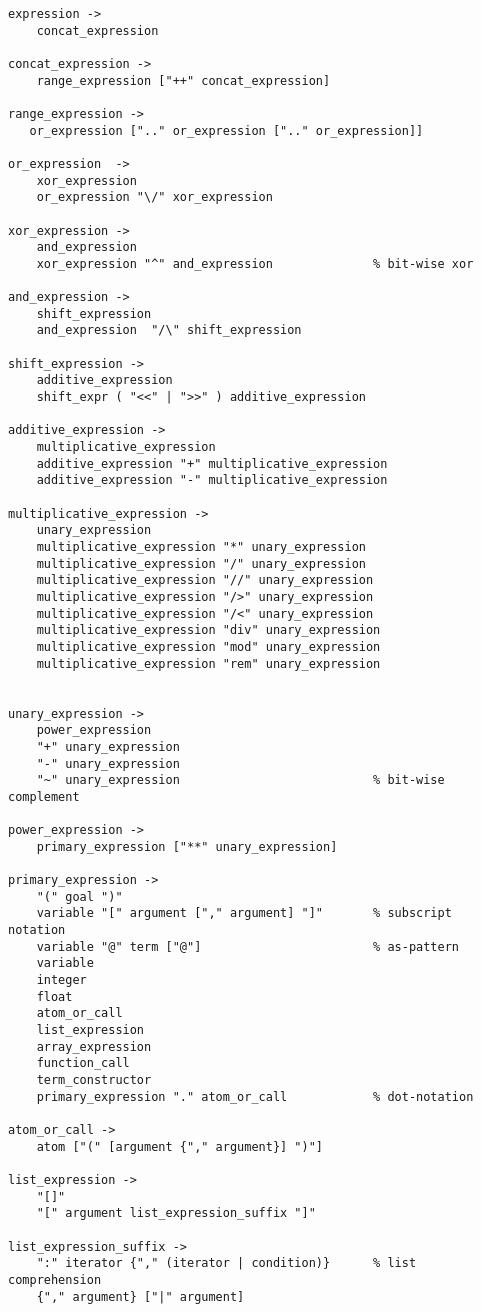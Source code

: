 \begin{scriptsize}
\begin{verbatim}
expression -> 
    concat_expression 

concat_expression ->
    range_expression ["++" concat_expression]

range_expression ->
   or_expression [".." or_expression [".." or_expression]]
    
or_expression  ->
    xor_expression 
    or_expression "\/" xor_expression

xor_expression ->  
    and_expression 
    xor_expression "^" and_expression              % bit-wise xor

and_expression ->
    shift_expression 
    and_expression  "/\" shift_expression

shift_expression ->
    additive_expression 
    shift_expr ( "<<" | ">>" ) additive_expression 

additive_expression ->
    multiplicative_expression
    additive_expression "+" multiplicative_expression
    additive_expression "-" multiplicative_expression

multiplicative_expression ->
    unary_expression
    multiplicative_expression "*" unary_expression
    multiplicative_expression "/" unary_expression
    multiplicative_expression "//" unary_expression
    multiplicative_expression "/>" unary_expression
    multiplicative_expression "/<" unary_expression
    multiplicative_expression "div" unary_expression
    multiplicative_expression "mod" unary_expression
    multiplicative_expression "rem" unary_expression

    
unary_expression ->
    power_expression
    "+" unary_expression
    "-" unary_expression
    "~" unary_expression                           % bit-wise complement

power_expression ->
    primary_expression ["**" unary_expression]

primary_expression ->
    "(" goal ")"
    variable "[" argument ["," argument] "]"       % subscript notation
    variable "@" term ["@"]                        % as-pattern
    variable
    integer
    float
    atom_or_call
    list_expression
    array_expression
    function_call
    term_constructor
    primary_expression "." atom_or_call            % dot-notation

atom_or_call ->
    atom ["(" [argument {"," argument}] ")"]  

list_expression ->
    "[]"
    "[" argument list_expression_suffix "]"

list_expression_suffix ->
    ":" iterator {"," (iterator | condition)}      % list comprehension
    {"," argument} ["|" argument] 


\end{verbatim}
\end{scriptsize}
